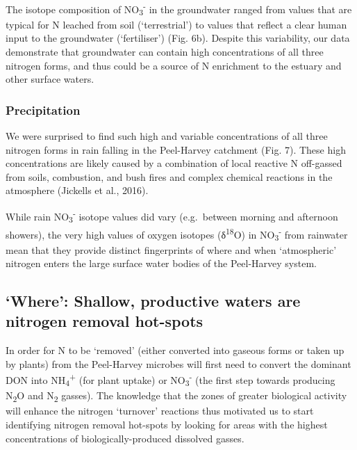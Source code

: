 \documentclass[
]{book}
\begin{document}
The isotope composition of NO\textsubscript{3}\textsuperscript{-} in the groundwater ranged from values that are typical for N leached from soil (`terrestrial') to values that reflect a clear human input to the groundwater (`fertiliser') (Fig. 6b). Despite this variability, our data demonstrate that groundwater can contain high concentrations of all three nitrogen forms, and thus could be a source of N enrichment to the estuary and other surface waters.~

\hypertarget{precipitation}{%
\subsubsection{Precipitation}\label{precipitation}}

We were surprised to find such high and variable concentrations of all three nitrogen forms in rain falling in the Peel-Harvey catchment (Fig. 7). These high concentrations are likely caused by a combination of local reactive N off-gassed from soils, combustion, and bush fires and complex chemical reactions in the atmosphere (Jickells et al., 2016).~

While rain NO\textsubscript{3}\textsuperscript{-} isotope values did vary (e.g.~between morning and afternoon showers), the very high values of oxygen isotopes (δ\textsuperscript{18}O) in NO\textsubscript{3}\textsuperscript{-} from rainwater mean that they provide distinct fingerprints of where and when `atmospheric' nitrogen enters the large surface water bodies of the Peel-Harvey system.~

\hypertarget{where-shallow-productive-waters-are-nitrogen-removal-hot-spots}{%
\subsection{`Where': Shallow, productive waters are nitrogen removal hot-spots}\label{where-shallow-productive-waters-are-nitrogen-removal-hot-spots}}

In order for N to be `removed' (either converted into gaseous forms or taken up by plants) from the Peel-Harvey microbes will first need to convert the dominant DON into NH\textsubscript{4}\textsuperscript{+} (for plant uptake) or NO\textsubscript{3}\textsuperscript{-} (the first step towards producing N\textsubscript{2}O and N\textsubscript{2} gasses). The knowledge that the zones of greater biological activity will enhance the nitrogen `turnover' reactions thus motivated us to start identifying nitrogen removal hot-spots by looking for areas with the highest concentrations of biologically-produced dissolved gasses.~
\end{document}
